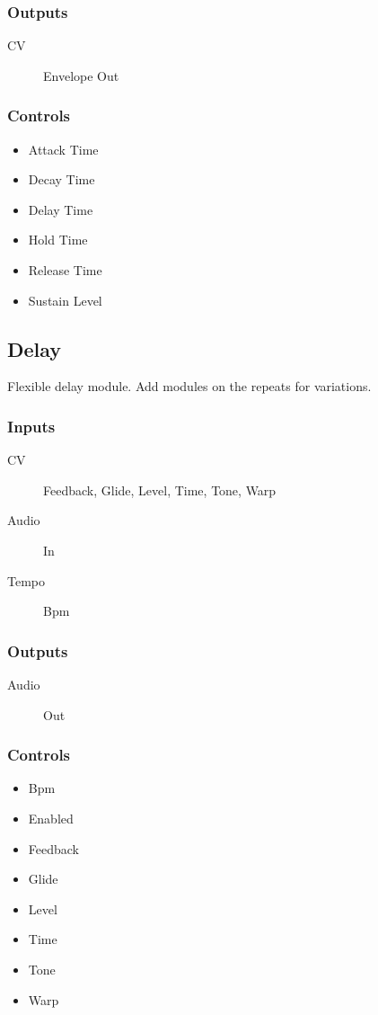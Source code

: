 \subsubsection{Outputs}
\begin{description}
\item [CV] Envelope Out
\end{description}

\subsubsection{Controls}
\begin{itemize}
\item Attack Time
\item Decay Time
\item Delay Time
\item Hold Time
\item Release Time
\item Sustain Level
\end{itemize}

\subsection{Delay}

Flexible delay module. Add modules on the repeats for variations.



\subsubsection{Inputs}
\begin{description}
\item [CV] Feedback, Glide, Level, Time, Tone, Warp
\item [Audio] In
\item [Tempo] Bpm
\end{description}

\subsubsection{Outputs}
\begin{description}
\item [Audio] Out
\end{description}

\subsubsection{Controls}
\begin{itemize}
\item Bpm
\item Enabled
\item Feedback
\item Glide
\item Level
\item Time
\item Tone
\item Warp
\end{itemize}

